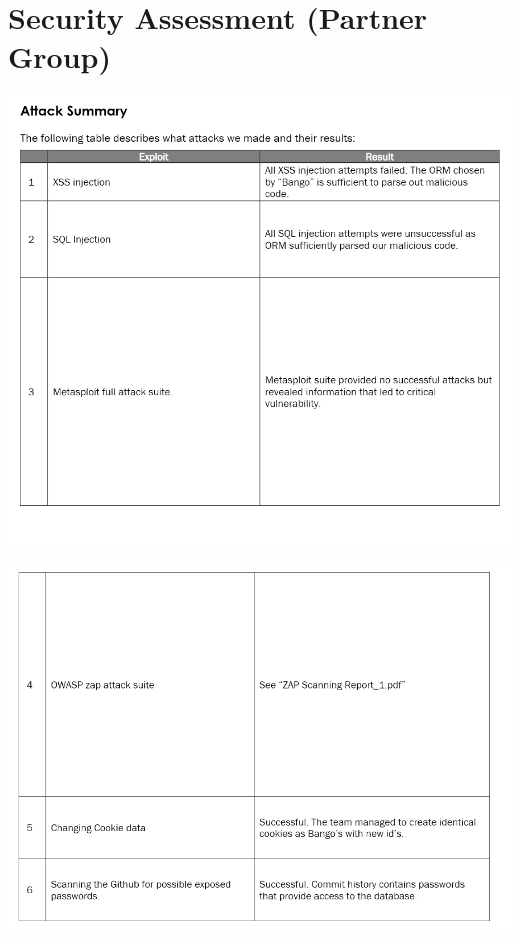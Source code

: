 \section{Security Assessment (Partner Group)}
\label{appendix:securityAssessment}

\includegraphics[width=1\textwidth]{images/Attack P1.png}

\includegraphics[width=1\textwidth]{images/Attack P2.png}

